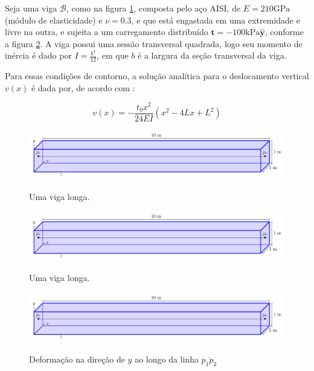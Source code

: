 Seja uma viga $\mathcal{B}$, como na figura \ref{fig:viga_longa_geometria}, composta pelo aço AISI, de $E = 210 \text{GPa}$ (módulo de elasticidade) e $\nu = 0.3$, e que está engastada em uma extremidade e livre na outra, e sujeita a um carregamento distribuído $\bm{t} = -100 \text{kPa} \hat{\bm{y}}$, conforme a figura \ref{fig:viga_longa_condicoes}. A viga possui uma sessão transversal quadrada, logo seu momento de inércia é dado por $I = \frac{b^4}{12}$, em que $b$ é a largura da seção transversal da viga.

Para essas condições de contorno, a solução analítica para o deslocamento vertical $v(x)$ é dada por, de acordo com :

\begin{equation}
    v(x) = -\frac{t_0 x^2}{24EI} \left(x^2 - 4 Lx + L^2\right)
\end{equation}

\begin{figure}
    \centering
    \caption{Uma viga longa.}
    \includegraphics[page=1, width=\textwidth]{Figuras/viga_longa.pdf}
    \label{fig:viga_longa_geometria}
\end{figure}

\begin{figure}
    \centering
    \caption{Uma viga longa.}
    \includegraphics[page=2, width=\textwidth]{Figuras/viga_longa.pdf}
    \label{fig:viga_longa_condicoes}
\end{figure}

\begin{figure}
    \centering  
    \caption{Deformação na direção de $y$ ao longo da linha $\overline{p_1 p_2}$}
    \includegraphics[page=3, width=\textwidth]{Figuras/viga_longa.pdf}
    \label{fig:viga_longa_deslocamento}
\end{figure}


